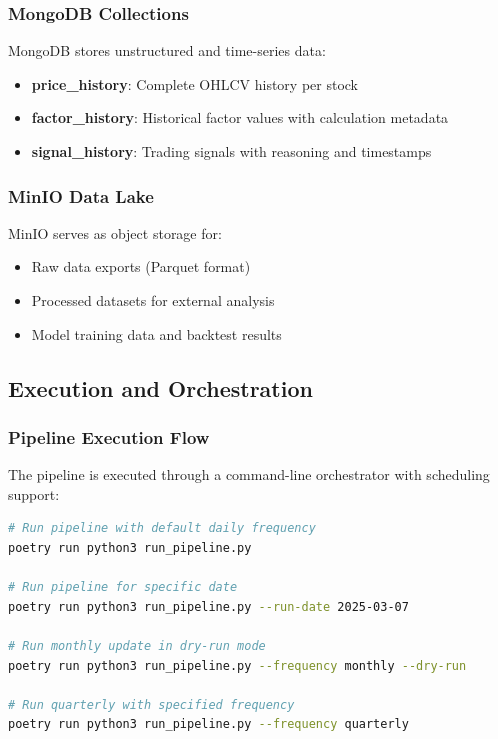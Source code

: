 \documentclass[11pt, a4paper, twoside]{article}
\begin{document}
\subsubsection{MongoDB Collections}

MongoDB stores unstructured and time-series data:

\begin{itemize}
    \item \textbf{price\_history}: Complete OHLCV history per stock
    \item \textbf{factor\_history}: Historical factor values with calculation metadata
    \item \textbf{signal\_history}: Trading signals with reasoning and timestamps
\end{itemize}

\subsubsection{MinIO Data Lake}

MinIO serves as object storage for:

\begin{itemize}
    \item Raw data exports (Parquet format)
    \item Processed datasets for external analysis
    \item Model training data and backtest results
\end{itemize}

\subsection{Execution and Orchestration}

\subsubsection{Pipeline Execution Flow}

The pipeline is executed through a command-line orchestrator with scheduling support:

\begin{lstlisting}[language=bash, caption=Pipeline Execution Examples]
# Run pipeline with default daily frequency
poetry run python3 run_pipeline.py

# Run pipeline for specific date
poetry run python3 run_pipeline.py --run-date 2025-03-07

# Run monthly update in dry-run mode
poetry run python3 run_pipeline.py --frequency monthly --dry-run

# Run quarterly with specified frequency
poetry run python3 run_pipeline.py --frequency quarterly
\end{lstlisting}
\end{document}
